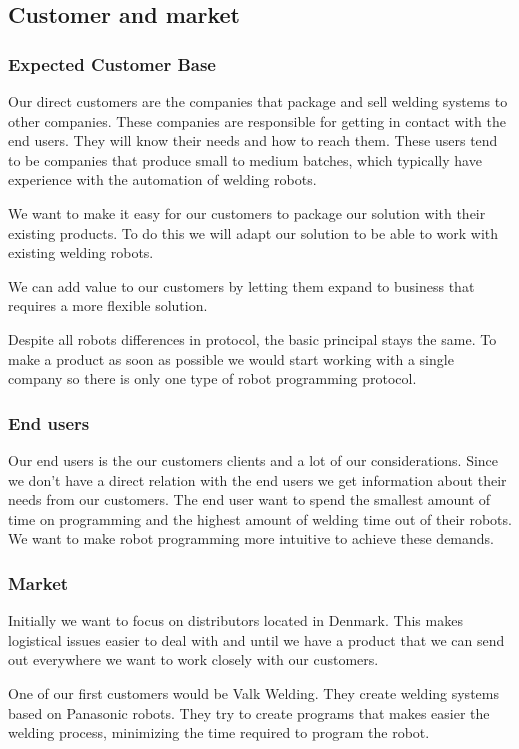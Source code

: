 \subsection{Customer and market}

\subsubsection{Expected Customer Base}
Our direct customers are the companies that package and sell welding systems to other companies. 
These companies are responsible for getting in contact with the end users. 
They will know their needs and how to reach them. 
These users tend to be companies that produce small to medium batches, which typically have experience with the automation of welding robots.

We want to make it easy for our customers to package our solution with their existing products.
To do this we will adapt our solution to be able to work with existing welding robots.

We can add value to our customers by letting them expand to business that requires a more flexible solution.

Despite all robots differences in protocol, the basic principal stays the same.
To make a product as soon as possible we would start working with a single company so there is only one type of robot programming protocol.

\subsubsection{End users}
Our end users is the our customers clients and a lot of our considerations.
Since we don't have a direct relation with the end users we get information about their needs from our customers.
The end user want to spend the smallest amount of time on programming and the highest amount of welding time out of their robots.
We want to make robot programming more intuitive to achieve these demands.

\subsubsection{Market}
Initially we want to focus on distributors located in Denmark.
This makes logistical issues easier to deal with and until we have a product that we can send out everywhere we want to work closely with our customers.

One of our first customers would be Valk Welding. They create welding systems based on Panasonic robots. They try to create programs that makes easier the welding process, minimizing the time required to program the robot.


